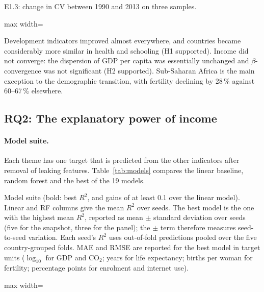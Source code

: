 \documentclass[11pt,a4paper]{article}
\newcommand{\tab}[1]{\begin{adjustbox}{max width=\textwidth}\end{adjustbox}}
\begin{document}
\begin{table}[htbp]\centering
\caption{E1.3: change in CV between 1990 and 2013 on three samples.}\label{tab:robust}
\tab{robust}
\end{table}

\begin{summary}[Answer to RQ1]
Development indicators improved almost everywhere, and countries became considerably more similar in health and schooling (H1 supported). Income did not converge: the dispersion of GDP per capita was essentially unchanged and $\beta$-convergence was not significant (H2 supported). Sub-Saharan Africa is the main exception to the demographic transition, with fertility declining by 28\,\% against 60--67\,\% elsewhere.
\end{summary}

\subsection{RQ2: The explanatory power of income}

\paragraph{Model suite.} Each theme has one target that is predicted from the other indicators after removal of leaking features. Table~\ref{tab:models} compares the linear baseline, random forest and the best of the 19 models.

\begin{table}[htbp]\centering
\caption[Model suite: cross-validated $R^2$, MAE and RMSE]{Model suite (bold: best $R^2$, and gains of at least 0.1 over the linear model). Linear and RF columns give the mean $R^2$ over seeds. The best model is the one with the highest mean $R^2$, reported as mean $\pm$ standard deviation over seeds (five for the snapshot, three for the panel); the $\pm$ term therefore measures seed-to-seed variation. Each seed's $R^2$ uses out-of-fold predictions pooled over the five country-grouped folds. MAE and RMSE are reported for the best model in target units ($\log_{10}$ for GDP and CO$_2$; years for life expectancy; births per woman for fertility; percentage points for enrolment and internet use).}\label{tab:models}
\tab{models}
\end{table}
\end{document}
